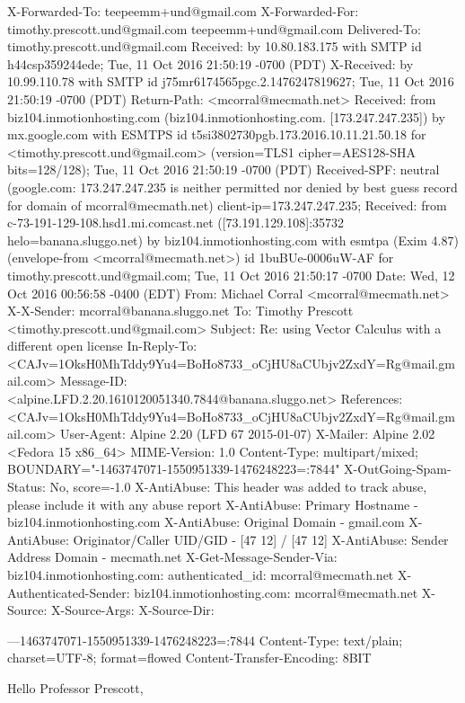 X-Forwarded-To: teepeemm+und@gmail.com
X-Forwarded-For: timothy.prescott.und@gmail.com teepeemm+und@gmail.com
Delivered-To: timothy.prescott.und@gmail.com
Received: by 10.80.183.175 with SMTP id h44csp359244ede;
        Tue, 11 Oct 2016 21:50:19 -0700 (PDT)
X-Received: by 10.99.110.78 with SMTP id j75mr6174565pgc.2.1476247819627;
        Tue, 11 Oct 2016 21:50:19 -0700 (PDT)
Return-Path: <mcorral@mecmath.net>
Received: from biz104.inmotionhosting.com (biz104.inmotionhosting.com. [173.247.247.235])
        by mx.google.com with ESMTPS id t5si3802730pgb.173.2016.10.11.21.50.18
        for <timothy.prescott.und@gmail.com>
        (version=TLS1 cipher=AES128-SHA bits=128/128);
        Tue, 11 Oct 2016 21:50:19 -0700 (PDT)
Received-SPF: neutral (google.com: 173.247.247.235 is neither permitted nor denied by best guess record for domain of mcorral@mecmath.net) client-ip=173.247.247.235;
Received: from c-73-191-129-108.hsd1.mi.comcast.net ([73.191.129.108]:35732 helo=banana.sluggo.net) by biz104.inmotionhosting.com with esmtpa (Exim 4.87) (envelope-from <mcorral@mecmath.net>) id 1buBUe-0006uW-AF for timothy.prescott.und@gmail.com; Tue, 11 Oct 2016 21:50:17 -0700
Date: Wed, 12 Oct 2016 00:56:58 -0400 (EDT)
From: Michael Corral <mcorral@mecmath.net>
X-X-Sender: mcorral@banana.sluggo.net
To: Timothy Prescott <timothy.prescott.und@gmail.com>
Subject: Re: using Vector Calculus with a different open license
In-Reply-To: <CAJv=1OksH0MhTddy9Yu4=BoHo8733_oCjHU8aCUbjv2ZxdY=Rg@mail.gmail.com>
Message-ID: <alpine.LFD.2.20.1610120051340.7844@banana.sluggo.net>
References: <CAJv=1OksH0MhTddy9Yu4=BoHo8733_oCjHU8aCUbjv2ZxdY=Rg@mail.gmail.com>
User-Agent: Alpine 2.20 (LFD 67 2015-01-07)
X-Mailer: Alpine 2.02 <Fedora 15 x86_64>
MIME-Version: 1.0
Content-Type: multipart/mixed; BOUNDARY="-1463747071-1550951339-1476248223=:7844"
X-OutGoing-Spam-Status: No, score=-1.0
X-AntiAbuse: This header was added to track abuse, please include it with any abuse report
X-AntiAbuse: Primary Hostname - biz104.inmotionhosting.com
X-AntiAbuse: Original Domain - gmail.com
X-AntiAbuse: Originator/Caller UID/GID - [47 12] / [47 12]
X-AntiAbuse: Sender Address Domain - mecmath.net
X-Get-Message-Sender-Via: biz104.inmotionhosting.com: authenticated_id: mcorral@mecmath.net
X-Authenticated-Sender: biz104.inmotionhosting.com: mcorral@mecmath.net
X-Source: 
X-Source-Args: 
X-Source-Dir: 

---1463747071-1550951339-1476248223=:7844
Content-Type: text/plain; charset=UTF-8; format=flowed
Content-Transfer-Encoding: 8BIT

Hello Professor Prescott,

